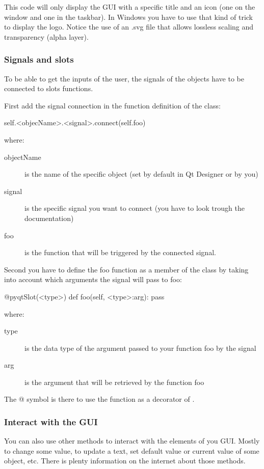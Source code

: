 \documentclass[english, 12 pt, openany, oneside]{book}
\begin{document}
This code will only display the GUI with a specific title and an icon (one on the window and one in the taskbar). In Windows you have to use that kind of trick to display the logo. Notice the use of an .svg file that allows lossless scaling and transparency (alpha layer).


\subsubsection{Signals and slots}
To be able to get the inputs of the user, the signals of the objects have to be connected to slots functions.

First add the signal connection in the  function definition of the  class:

\begin{pyverbatim}
self.<objecName>.<signal>.connect(self.foo)
\end{pyverbatim}

where:

\begin{description}
\item[objectName] is the name of the specific object (set by default in Qt Designer or by you)
\item[signal] is the specific signal you want to connect (you have to look trough the documentation)
\item[foo] is the function that will be triggered by the connected signal.
\end{description}

Second you have to define the foo function as a member of the  class by taking into account which arguments the signal will pass to foo:

\begin{pyverbatim}
@pyqtSlot(<type>)
def foo(self, <type>:arg):
	pass
\end{pyverbatim}
where:

\begin{description}
\item[type] is the data type of the argument passed to your function foo by the signal
\item[arg] is the argument that will be retrieved by the function foo
\end{description}

The @ symbol is there to use the function as a decorator of .

\subsubsection{Interact with the GUI}
You can also use other methods to interact with the elements of you GUI. Mostly to change some value, to update a text, set default value or current value of some object, etc. There is plenty information on the internet about those methods.
\end{document}
